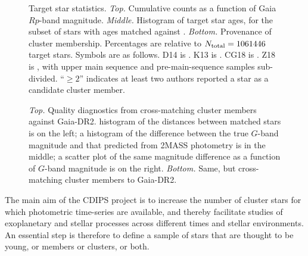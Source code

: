 \documentclass[12pt,twocolumn,tighten]{aastex62}
\begin{document}
\begin{figure}[!t]
	\begin{center}
		\leavevmode
		\vspace{-0.8cm}
		\vspace{-0.8cm}
	\end{center}
	\vspace{-0.8cm}
	\caption{
		Target star statistics.
		{\it Top.} Cumulative counts as a function of Gaia $Rp$-band
		magnitude.  
		{\it Middle.} Histogram of target star ages, for the subset of
		stars with ages matched against \citet{Kharchenko_et_al_2013}.
		{\it Bottom.} Provenance of cluster membership.  Percentages are
		relative to $N_{\rm total}=1061446$ target stars. Symbols
		are as follows.
		D14 is \citet{dias_proper_2014}.
		K13 is \citet{Kharchenko_et_al_2013}.
		CG18 is \citet{cantat-gaudin_gaia_2018}.
		Z18 is \citet{zari_3d_2018}, with upper main sequence and
		pre-main-sequence samples sub-divided.
		``$\geq 2$'' indicates at least two authors reported a star as a
		candidate cluster member.
		\label{fig:cdips_targets}
	}
\end{figure}

\begin{figure}[!t]
	\vspace{-0.8cm}
	\vspace{-0.8cm}
	\caption{
		{\it Top.} Quality diagnostics from cross-matching
		\cite{Kharchenko_et_al_2013} cluster members against Gaia-DR2.
		histogram of the distances between matched stars is on the left; a
		histogram of the difference between the true $G$-band magnitude
		and that predicted from 2MASS photometry is in the middle; a scatter
		plot of the same magnitude difference as a function of $G$-band
		magnitude is on the right.
		{\it Bottom.} Same, but cross-matching \cite{dias_proper_2014}
		cluster members to Gaia-DR2.
	}
	\label{fig:xmatch_info}
\end{figure}

The main aim of the CDIPS project is to increase the number of cluster
stars for which photometric time-series are available, and thereby
facilitate studies of exoplanetary and stellar processes across
different times and stellar environments.  An essential step is
therefore to define a sample of stars that are thought to be young, or
members or clusters, or both.
\end{document}
